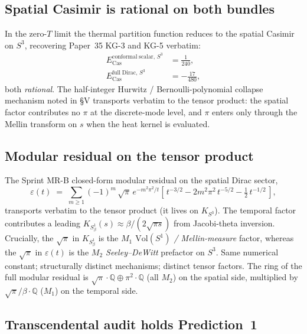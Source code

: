 \documentclass[11pt]{article}
\begin{document}
\subsection{Spatial Casimir is rational on both bundles}
\label{subsec:tensor_spatial_casimir}

In the zero-$T$ limit the thermal partition function reduces to the
spatial Casimir on $S^3$, recovering Paper~35 KG-3 and KG-5 verbatim:
\begin{align*}
E_{\mathrm{Cas}}^{\mathrm{conformal\;scalar},\,S^3} &= \tfrac{1}{240}, \\
E_{\mathrm{Cas}}^{\mathrm{full\;Dirac},\,S^3} &= -\tfrac{17}{480},
\end{align*}
both \emph{rational}.  The half-integer Hurwitz / Bernoulli-polynomial
collapse mechanism noted in §V transports verbatim to the tensor
product: the spatial factor contributes no $\pi$ at the discrete-mode
level, and $\pi$ enters only through the Mellin transform on $s$ when
the heat kernel is evaluated.

\subsection{Modular residual on the tensor product}
\label{subsec:tensor_modular}

The Sprint MR-B closed-form modular residual on the spatial Dirac
sector,
\begin{equation}
\label{eq:dirac_modular_residual_tensor}
\varepsilon(t) \;=\; \sum_{m\geq 1} (-1)^m\,\sqrt{\pi}\,e^{-m^2\pi^2/t}
                    \left[\,t^{-3/2} - 2m^2\pi^2\,t^{-5/2}
                          - \tfrac{1}{2}\,t^{-1/2}\,\right],
\end{equation}
transports verbatim to the tensor product (it lives on $K_{S^3}$).
The temporal factor contributes a leading
$K_{S^1_\beta}(s) \approx \beta/(2\sqrt{\pi s})$ from Jacobi-theta
inversion.  Crucially, the $\sqrt{\pi}$ in $K_{S^1_\beta}$ is the
\emph{$M_1$ $\mathrm{Vol}(S^1)$ / Mellin-measure} factor, whereas the
$\sqrt{\pi}$ in $\varepsilon(t)$ is the \emph{$M_2$ Seeley--DeWitt}
prefactor on $S^3$.  Same numerical constant; structurally distinct
mechanisms; distinct tensor factors.  The ring of the full modular
residual is $\sqrt{\pi}\cdot\mathbb{Q} \oplus \pi^2\cdot\mathbb{Q}$
(all $M_2$) on the spatial side, multiplied by
$\sqrt{\pi}/\beta\cdot\mathbb{Q}$ ($M_1$) on the temporal side.

\subsection{Transcendental audit holds Prediction~1}
\label{subsec:tensor_audit}
\end{document}
